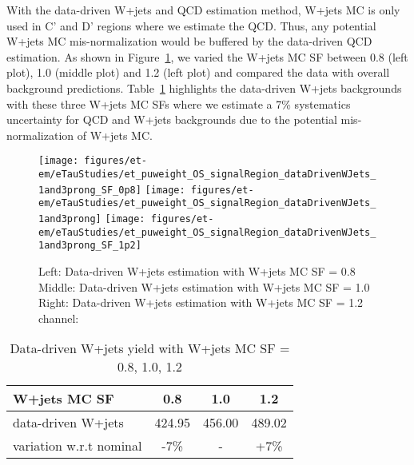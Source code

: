 With the data-driven W+jets and QCD estimation method, W+jets MC is only used in C' and D' regions where we 
estimate the QCD. Thus, any potential W+jets MC mis-normalization would be buffered by the data-driven QCD estimation.
As shown in Figure~\ref{fig:dataDrivenWJets_scale}, we varied the W+jets MC SF between 0.8 (left plot), 1.0 (middle plot) 
and 1.2 (left plot) and compared the data with overall background predictions. Table~\ref{tab:WJetsPlusQCD} highlights the 
data-driven W+jets backgrounds with these three W+jets MC SFs where we estimate a 7\% systematics uncertainty for QCD and W+jets 
backgrounds due to the potential mis-normalization of W+jets MC.

\begin{figure}\centering
  \texttt{[image: figures/et-em/eTauStudies/et\_puweight\_OS\_signalRegion\_dataDrivenWJets\_1and3prong\_SF\_0p8]}
  \texttt{[image: figures/et-em/eTauStudies/et\_puweight\_OS\_signalRegion\_dataDrivenWJets\_1and3prong]}
  \texttt{[image: figures/et-em/eTauStudies/et\_puweight\_OS\_signalRegion\_dataDrivenWJets\_1and3prong\_SF\_1p2]}
  \caption{\label{fig:dataDrivenWJets_scale} Left: Data-driven W+jets estimation with W+jets MC SF = 0.8
    Middle: Data-driven W+jets estimation with W+jets MC SF = 1.0
    Right: Data-driven W+jets estimation with W+jets MC SF = 1.2 \teth
    channel: \meffetau}
\end{figure}

\begin{table}[ht]
\begin{center}
 \caption{Data-driven W+jets yield with W+jets MC SF = 0.8, 1.0, 1.2\label{tab:WJetsPlusQCD}}
 \begin{tabular}{| l | c | c | c |}
 \hline
      W+jets MC SF                      & 0.8                       & 1.0                       & 1.2       \\ \hline
      data-driven W+jets                & 424.95                    & 456.00                    & 489.02    \\ \hline
      variation w.r.t nominal           & -7\%                      & -                         & +7\%    \\
 \hline
 \end{tabular}
\end{center}
\end{table}
